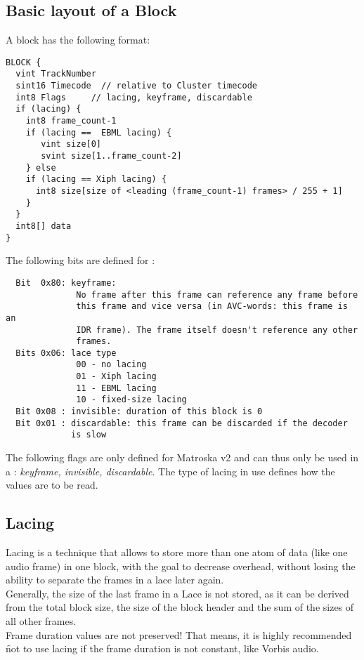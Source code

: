 \documentclass[12pt]{article}
\begin{document}
\subsection{Basic layout of a Block}
\label{sec_blocklayout}
A \Matroska block has the following format:
\begin{lstlisting}
BLOCK {
  vint TrackNumber
  sint16 Timecode  // relative to Cluster timecode
  int8 Flags     // lacing, keyframe, discardable
  if (lacing) {
    int8 frame_count-1
    if (lacing ==  EBML lacing) {
       vint size[0]
       svint size[1..frame_count-2]
    } else 
    if (lacing == Xiph lacing) {
      int8 size[size of <leading (frame_count-1) frames> / 255 + 1]
    }
  }
  int8[] data 
}
\end{lstlisting}
The following bits are defined for :
\begin{verbatim}  Bit  0x80: keyframe:
              No frame after this frame can reference any frame before
              this frame and vice versa (in AVC-words: this frame is an
              IDR frame). The frame itself doesn't reference any other
              frames.
  Bits 0x06: lace type
              00 - no lacing
              01 - Xiph lacing
              11 - EBML lacing
              10 - fixed-size lacing
  Bit 0x08 : invisible: duration of this block is 0
  Bit 0x01 : discardable: this frame can be discarded if the decoder
             is slow
\end{verbatim}
The following flags are only defined for Matroska v2 and can thus only be used in a : \textsl{keyframe, invisible, discardable}.
The type of lacing in use defines how the  values are to be read.
\subsection{Lacing}
\label{sec_lacing}
Lacing is a technique that allows to store more than one atom of data (like one
audio frame) in one block, with the goal to decrease overhead, without losing
the ability to separate the frames in a lace later again.\\[0.3cm]
Generally, the size of the last frame in a Lace is not stored, as it can be derived
from the total block size, the size of the block header and the sum of the sizes
of all other frames.\\
Frame duration values are not preserved! That means, it is highly recommended \f{not}
to use lacing if the frame duration is not constant, like Vorbis audio.
\end{document}
